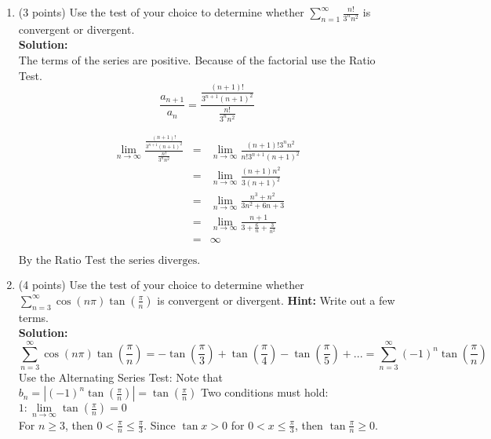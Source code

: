 \documentclass[paper=a4, fontsize=11pt]{scrartcl} %
\numberwithin{equation}{section} %
\numberwithin{figure}{section} %
\numberwithin{table}{section} %
\begin{document}
\begin{enumerate}
\item (3 points) Use the test of your choice to determine whether 
$\sum\limits_{n=1}^\infty \frac{n!}{3^n n^2}$ is convergent or divergent.\\
\noindent\textbf{Solution:}\\
The terms of the series are positive.  Because of the factorial use the Ratio Test.
\begin{equation*}
\frac{a_{n+1}}{a_n}=\frac{\frac{(n+1)!}{3^{n+1}(n+1)^2}}{\frac{n!}{3^n n^2}}
\end{equation*}

\begin{eqnarray*}
\lim\limits_{n \rightarrow\infty} \frac{\frac{(n+1)!}{3^{n+1}(n+1)^2}}{\frac{n!}{3^n n^2}}&=&\lim\limits_{n \rightarrow\infty} \frac{(n+1)!3^n n^2}{n! 3^{n+1}(n+1)^2}\\
&=&\lim\limits_{n \rightarrow\infty} \frac{(n+1) n^2}{ 3(n+1)^2}\\
&=&\lim\limits_{n \rightarrow\infty} \frac{n^3+n^2}{ 3n^2+6n+3} \\
&=&\lim\limits_{n \rightarrow\infty} \frac{n+1}{ 3+\frac{6}{n}+\frac{3}{n^2}}  \\
&=& \infty
\end{eqnarray*}

$\boxed{ \text{By the Ratio Test the series diverges.}}$
\newpage

\item (4 points) Use the test of your choice to determine whether 
$\sum\limits_{n=3}^\infty \cos (n \pi) \tan (\frac{\pi}{n})$ is convergent or divergent. \textbf{Hint:} Write out a few terms.\\
\noindent\textbf{Solution:}\\
\begin{equation*}
\sum\limits_{n=3}^\infty \cos (n \pi) \tan (\frac{\pi}{n}) = -\tan (\frac{\pi}{3}) + \tan (\frac{\pi}{4}) -\tan (\frac{\pi}{5}) + ... = \sum\limits_{n=3}^\infty (-1)^n \tan (\frac{\pi}{n})
\end{equation*}
Use the Alternating Series Test:  Note that $b_n = |(-1)^n \tan (\frac{\pi}{n})| =\tan (\frac{\pi}{n}) $
Two conditions must hold: \\
$1: \lim\limits_{n \rightarrow\infty} \tan \left( \frac{\pi}{n} \right) = 0$ \\
For $n \ge 3$, then $0<\frac{\pi}{n} \le \frac{\pi}{3}$.  Since $\tan x > 0$ for $0 < x \le \frac{\pi}{3}$, then $\tan \frac{\pi}{n} \ge 0$.\\


\end{enumerate}
\end{document}
